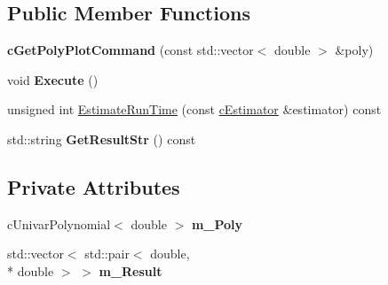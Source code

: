 \subsection*{Public Member Functions}
\begin{DoxyCompactItemize}
\item 
\hypertarget{classengine_1_1cGetPolyPlotCommand_ae54fdcd733460be4949b57098f35241e}{{\bfseries c\-Get\-Poly\-Plot\-Command} (const std\-::vector$<$ double $>$ \&poly)}\label{classengine_1_1cGetPolyPlotCommand_ae54fdcd733460be4949b57098f35241e}

\item 
\hypertarget{classengine_1_1cGetPolyPlotCommand_af714f9e6aa21f8e327106c7d85410c27}{void {\bfseries Execute} ()}\label{classengine_1_1cGetPolyPlotCommand_af714f9e6aa21f8e327106c7d85410c27}

\item 
unsigned int \hyperlink{classengine_1_1cGetPolyPlotCommand_a9433a77a77d10f7164be89b2639bfded}{Estimate\-Run\-Time} (const \hyperlink{classengine_1_1cEstimator}{c\-Estimator} \&estimator) const 
\item 
\hypertarget{classengine_1_1cGetPolyPlotCommand_a561d38463baf4f0c78e4efb30fb6e034}{std\-::string {\bfseries Get\-Result\-Str} () const }\label{classengine_1_1cGetPolyPlotCommand_a561d38463baf4f0c78e4efb30fb6e034}

\end{DoxyCompactItemize}
\subsection*{Private Attributes}
\begin{DoxyCompactItemize}
\item 
\hypertarget{classengine_1_1cGetPolyPlotCommand_af56ef1f48ce00043f419b8bfcb730e7a}{c\-Univar\-Polynomial$<$ double $>$ {\bfseries m\-\_\-\-Poly}}\label{classengine_1_1cGetPolyPlotCommand_af56ef1f48ce00043f419b8bfcb730e7a}

\item 
\hypertarget{classengine_1_1cGetPolyPlotCommand_a08e5df01f0b0b2a826892f84151ff561}{std\-::vector$<$ std\-::pair$<$ double, \\*
double $>$ $>$ {\bfseries m\-\_\-\-Result}}\label{classengine_1_1cGetPolyPlotCommand_a08e5df01f0b0b2a826892f84151ff561}

\end{DoxyCompactItemize}


